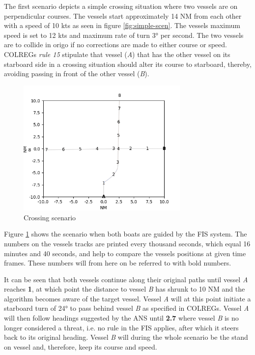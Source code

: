 The first scenario depicts a simple crossing situation where two vessels are on perpendicular courses. The vessels start  approximately 14 NM from each other with a speed of 10 kts as seen in figure \ref{fig:simple-scen}. The vessels maximum speed is set to 12 kts and maximum rate of turn \ang{3} per second. The two vessels are to  collide in origo if no corrections are made to either course or speed. COLREGs \textit{rule 15} stipulate that vessel (\textit{A}) that has the other vessel on its starboard side  in a crossing situation should alter its course to starboard, thereby, avoiding passing in front of the other vessel (\textit{B}).
\begin{figure}[H]
    \centering
    \includegraphics[width=0.75\textwidth,height=0.75\textheight,keepaspectratio]{../src/img/crossing_res.png}
    \caption{Crossing scenario}
    \label{fig:simple-scen-res}
\end{figure}

Figure \ref{fig:simple-scen-res} shows the scenario when both boats are guided by the FIS system. The numbers on the vessels tracks are printed every thousand seconds, which equal 16 minutes and 40 seconds, and help to compare the vessels positions at  given time frames. These numbers will from here on be referred to with bold numbers.

It can be seen that both vessels continue along their original paths until vessel \textit{A} reaches \textbf{1}, at which point the distance to vessel \textit{B} has shrunk to 10 NM and the algorithm becomes aware of the target vessel. Vessel \textit{A} will at this point initiate a starboard turn  of \ang{24}  to pass behind vessel \textit{B} as specified in COLREGs. Vessel \textit{A} will then follow headings suggested by the ANS until \textbf{2.7} where  vessel \textit{B} is no longer considered a threat, i.e. no rule in the FIS applies, after which it steers back to its original heading. Vessel \textit{B} will during the whole scenario be the stand on vessel and, therefore, keep its course and speed.

